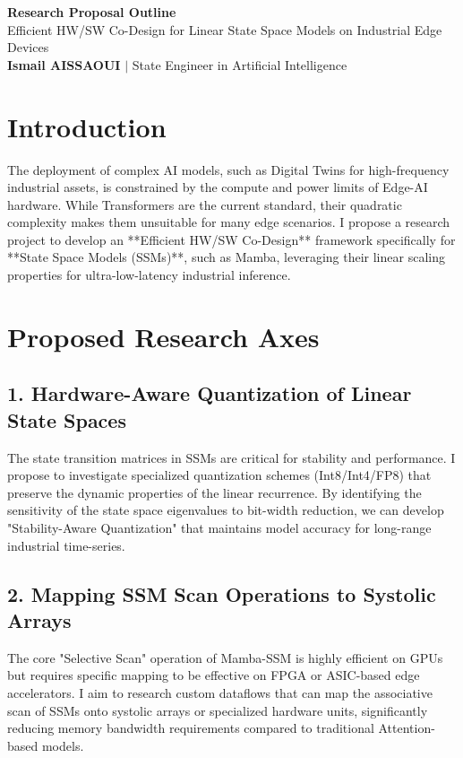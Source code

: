 \documentclass[11pt,a4paper]{article}
\begin{document}
\begin{center}
    {\LARGE\bfseries\color{tumblue} Research Proposal Outline}\\[6pt]
    {\large Efficient HW/SW Co-Design for Linear State Space Models on Industrial Edge Devices}\\[4pt]
    \textbf{Ismail AISSAOUI} $|$ State Engineer in Artificial Intelligence
\end{center}

\bigskip

\section{Introduction}
The deployment of complex AI models, such as Digital Twins for high-frequency industrial assets, is constrained by the compute and power limits of Edge-AI hardware. While Transformers are the current standard, their quadratic complexity makes them unsuitable for many edge scenarios. I propose a research project to develop an **Efficient HW/SW Co-Design** framework specifically for **State Space Models (SSMs)**, such as Mamba, leveraging their linear scaling properties for ultra-low-latency industrial inference.

\section{Proposed Research Axes}

\subsection{1. Hardware-Aware Quantization of Linear State Spaces}
The state transition matrices in SSMs are critical for stability and performance. I propose to investigate specialized quantization schemes (Int8/Int4/FP8) that preserve the dynamic properties of the linear recurrence. By identifying the sensitivity of the state space eigenvalues to bit-width reduction, we can develop "Stability-Aware Quantization" that maintains model accuracy for long-range industrial time-series.

\subsection{2. Mapping SSM Scan Operations to Systolic Arrays}
The core "Selective Scan" operation of Mamba-SSM is highly efficient on GPUs but requires specific mapping to be effective on FPGA or ASIC-based edge accelerators. I aim to research custom dataflows that can map the associative scan of SSMs onto systolic arrays or specialized hardware units, significantly reducing memory bandwidth requirements compared to traditional Attention-based models.
\end{document}
